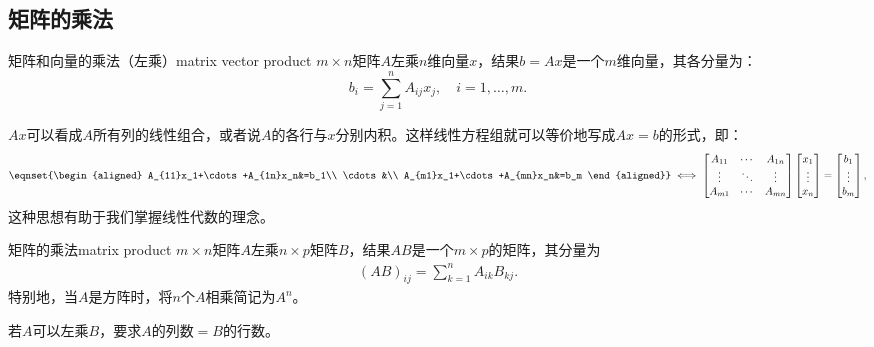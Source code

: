\subsection{矩阵的乘法}

\begin{definition}
	{矩阵和向量的乘法（左乘）}{matrix vector product}
	$m\times n$矩阵$A$左乘$n$维向量$x$，结果$b=Ax$是一个$m$维向量，其各分量为：
	\begin{equation}
		b_i=\sum_{j=1}^nA_{ij}x_j,\quad i=1,\ldots,m.
	\end{equation}
\end{definition}

\begin{remark}
	$Ax$可以看成$A$所有列的线性组合，或者说$A$的各行与$x$分别内积。这样线性方程组就可以等价地写成$Ax=b$的形式，即：
	\[
		\eqnset{\begin{aligned}
	        A_{11}x_1+\cdots+A_{1n}x_n&=b_1\\
	        \cdots&\\
	        A_{m1}x_1+\cdots+A_{mn}x_n&=b_m
	    \end{aligned}}\iff
	    \begin{bmatrix}
	        A_{11}&\cdots&A_{1n}\\
	        \vdots&\ddots&\vdots\\
	        A_{m1}&\cdots&A_{mn}
	    \end{bmatrix}
	    \begin{bmatrix}
	        x_1\\\vdots\\x_n
	    \end{bmatrix}=
	    \begin{bmatrix}
	        b_1\\\vdots\\b_m
	    \end{bmatrix},
	\]
	这种思想有助于我们掌握线性代数的理念。
\end{remark}

\begin{definition}{矩阵的乘法}{matrix product}
	$m\times n$矩阵$A$左乘$n\times p$矩阵$B$，结果$AB$是一个$m\times p$的矩阵，其分量为
	\begin{align}
		(AB)_{ij}=\sum_{k=1}^nA_{ik}B_{kj}.
	\end{align}
	特别地，当$A$是方阵时，将$n$个$A$相乘简记为$A^n$。
\end{definition}

\begin{remark}
	若$A$可以左乘$B$，要求$A$的列数$=B$的行数。
\end{remark}

